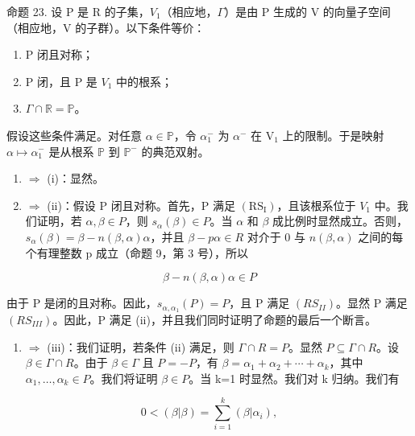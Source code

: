 命题 23. 设 P 是 R 的子集，\(V_{1}\)（相应地，\(\Gamma\)）是由 P 生成的 V 的向量子空间（相应地，V 的子群）。以下条件等价：

\begin{enumerate}
\def\labelenumi{(\roman{enumi})}
\item
  P 闭且对称；
\item
  P 闭，且 P 是 \(V_{1}\) 中的根系；
\item
  \(\Gamma \cap \mathbb{R} = \mathbb{P}\)。
\end{enumerate}

假设这些条件满足。对任意 \(\alpha \in \mathbb{P}\)，令 \(\alpha_{1}^{-}\) 为 \(\alpha^{-}\) 在 \(\mathrm{V}_{1}\) 上的限制。于是映射 \(\alpha \mapsto \alpha_{1}^{-}\) 是从根系 \(\mathbb{P}\) 到 \(\mathbb{P}^{-}\) 的典范双射。

\begin{enumerate}
\def\labelenumi{(\roman{enumi})}
\setcounter{enumi}{2}
\item
  \(\Longrightarrow\) (i)：显然。
\item
   \(\Longrightarrow\) (ii)：假设 P 闭且对称。首先，P 满足 \((\mathrm{RS}_{\mathrm{I}})\)，且该根系位于 \(V_{1}\) 中。我们证明，若 \(\alpha, \beta \in P\)，则 \(s_{\alpha}(\beta) \in P\)。当 \(\alpha\) 和 \(\beta\) 成比例时显然成立。否则，\(s_{\alpha}(\beta) = \beta - n(\beta, \alpha)\alpha\)，并且 \(\beta - p\alpha \in R\) 对介于 0 与 \(n(\beta, \alpha)\) 之间的每个有理整数 p 成立（命题 9，第 3 号），所以
\end{enumerate}

\[
\beta - n (\beta , \alpha) \alpha \in P
\]

由于 P 是闭的且对称。因此，\(s_{\alpha,\alpha_{1}}(P) = P\)，且 P 满足 \((RS_{II})\)。显然 P 满足 \((RS_{III})\)。因此，P 满足 (ii)，并且我们同时证明了命题的最后一个断言。

\begin{enumerate}
\def\labelenumi{(\roman{enumi})}
\setcounter{enumi}{1}
\tightlist
\item
  \(\Longrightarrow\) (iii)：我们证明，若条件 (ii) 满足，则 \(\Gamma\cap R=P\)。显然 \(P\subseteq\Gamma\cap R\)。设 \(\beta\in\Gamma\cap R\)。由于 \(\beta\in\Gamma\) 且 \(P=-P\)，有 \(\beta=\alpha_{1}+\alpha_{2}+\cdots+\alpha_{k}\)，其中 \(\alpha_{1},\ldots,\alpha_{k}\in P\)。我们将证明 \(\beta\in P\)。当 k=1 时显然。我们对 k 归纳。我们有
\end{enumerate}

\[
0 <   (\beta | \beta) = \sum_ {i = 1} ^ {k} (\beta | \alpha_ {i}),
\]

